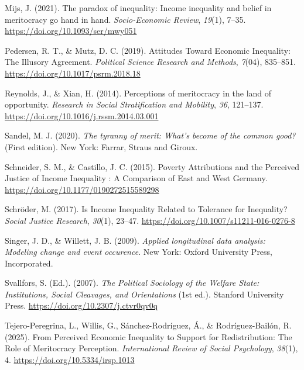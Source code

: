 \documentclass[
  12pt,
]{article}
\newlength{\cslhangindent}
\newenvironment{CSLReferences}[2] %
 {\begin{list}{}{%
  \setlength{\itemindent}{0pt}
  \setlength{\leftmargin}{0pt}
  \setlength{\parsep}{0pt}
  \ifodd #1
   \setlength{\leftmargin}{\cslhangindent}
   \setlength{\itemindent}{-1\cslhangindent}
  \fi
  \setlength{\itemsep}{#2\baselineskip}}}
 {\end{list}}
\begin{document}
\begin{CSLReferences}{1}{0}
Mijs, J. (2021). The paradox of inequality: Income inequality and belief
in meritocracy go hand in hand. \emph{Socio-Economic Review},
\emph{19}(1), 7--35. \url{https://doi.org/10.1093/ser/mwy051}

Pedersen, R. T., \& Mutz, D. C. (2019). Attitudes {Toward Economic
Inequality}: {The Illusory Agreement}. \emph{Political Science Research
and Methods}, \emph{7}(04), 835--851.
\url{https://doi.org/10.1017/psrm.2018.18}

Reynolds, J., \& Xian, H. (2014). Perceptions of meritocracy in the land
of opportunity. \emph{Research in Social Stratification and Mobility},
\emph{36}, 121--137. \url{https://doi.org/10.1016/j.rssm.2014.03.001}

Sandel, M. J. (2020). \emph{The tyranny of merit: {What}'s become of the
common good?} (First edition). New York: {Farrar, Straus and Giroux}.

Schneider, S. M., \& Castillo, J. C. (2015). Poverty {Attributions} and
the {Perceived Justice} of {Income Inequality} : {A Comparison} of
{East} and {West Germany}.
\url{https://doi.org/10.1177/0190272515589298}

Schröder, M. (2017). Is {Income Inequality Related} to {Tolerance} for
{Inequality}? \emph{Social Justice Research}, \emph{30}(1), 23--47.
\url{https://doi.org/10.1007/s11211-016-0276-8}

Singer, J. D., \& Willett, J. B. (2009). \emph{Applied longitudinal data
analysis: Modeling change and event occurence}. New York: Oxford
University Press, Incorporated.

Svallfors, S. (Ed.). (2007). \emph{The {Political Sociology} of the
{Welfare State}: {Institutions}, {Social Cleavages}, and {Orientations}}
(1st ed.). Stanford University Press.
\url{https://doi.org/10.2307/j.ctvr0qv0q}

Tejero-Peregrina, L., Willis, G., Sánchez-Rodríguez, Á., \&
Rodríguez-Bailón, R. (2025). From {Perceived Economic Inequality} to
{Support} for {Redistribution}: {The Role} of {Meritocracy Perception}.
\emph{International Review of Social Psychology}, \emph{38}(1), 4.
\url{https://doi.org/10.5334/irsp.1013}


\end{CSLReferences}
\end{document}
